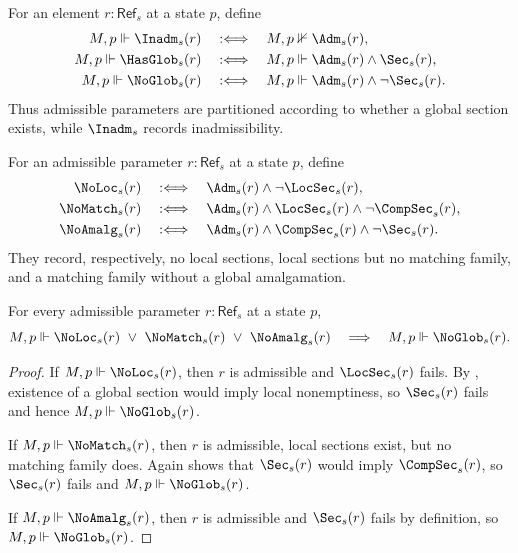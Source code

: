 \begin{definition}\label{def:undef-total-null}
For an element $r:\mathsf{Ref}_s$ at a state $p$, define
\begin{align*}
M,p\Vdash \Inadm_s(r)
&\quad:\Longleftrightarrow\quad
M,p\nVdash \Adm_s(r),\\
M,p\Vdash \HasGlob_s(r)
&\quad:\Longleftrightarrow\quad
M,p\Vdash \Adm_s(r)\land \Sec_s(r),\\
M,p\Vdash \NoGlob_s(r)
&\quad:\Longleftrightarrow\quad
M,p\Vdash \Adm_s(r)\land \neg\Sec_s(r).
\end{align*}
Thus admissible parameters are partitioned according to whether a global section exists, while $\Inadm_s$ records inadmissibility.
\end{definition}

\begin{definition}\label{def:null-failure-modes}
For an admissible parameter $r:\mathsf{Ref}_s$ at a state $p$, define
\begin{align*}
\NoLoc_s(r)
&\quad:\Longleftrightarrow\quad
\Adm_s(r)\land \neg\LocSec_s(r),\\
\NoMatch_s(r)
&\quad:\Longleftrightarrow\quad
\Adm_s(r)\land \LocSec_s(r)\land \neg\CompSec_s(r),\\
\NoAmalg_s(r)
&\quad:\Longleftrightarrow\quad
\Adm_s(r)\land \CompSec_s(r)\land \neg\Sec_s(r).
\end{align*}
They record, respectively, no local sections, local sections but no matching family, and a matching family without a global amalgamation.
\end{definition}

\begin{proposition}\label{prop:null-modes-imply-null}
For every admissible parameter $r:\mathsf{Ref}_s$ at a state $p$,
\[
M,p\Vdash \NoLoc_s(r)\ \lor\ \NoMatch_s(r)\ \lor\ \NoAmalg_s(r)
\quad\Longrightarrow\quad
M,p\Vdash \NoGlob_s(r).
\]
\end{proposition}

\begin{proof}
If $M,p\Vdash \NoLoc_s(r)$, then $r$ is admissible and $\LocSec_s(r)$ fails. By , existence of a global section would imply local nonemptiness, so $\Sec_s(r)$ fails and hence $M,p\Vdash \NoGlob_s(r)$.

If $M,p\Vdash \NoMatch_s(r)$, then $r$ is admissible, local sections exist, but no matching family does. Again  shows that $\Sec_s(r)$ would imply $\CompSec_s(r)$, so $\Sec_s(r)$ fails and $M,p\Vdash \NoGlob_s(r)$.

If $M,p\Vdash \NoAmalg_s(r)$, then $r$ is admissible and $\Sec_s(r)$ fails by definition, so $M,p\Vdash \NoGlob_s(r)$.
\end{proof}

